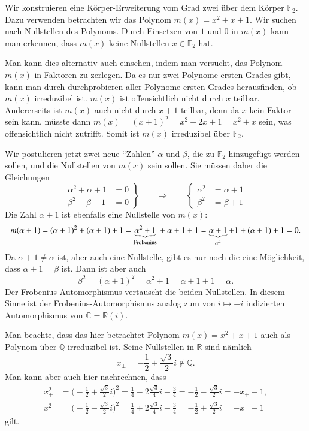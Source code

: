 \begin{beispiel}
Wir konstruieren eine Körper-Erweiterung vom Grad zwei über dem Körper
$\mathbb F_2$.
Dazu verwenden betrachten wir das Polynom $m(x)=x^2 + x + 1$.
Wir suchen nach Nullstellen des Polynoms.
Durch Einsetzen von $1$ und $0$ in $m(x)$ kann man erkennen, dass
$m(x)$ keine Nullstellen $x\in\mathbb F_2$ hat.

Man kann dies alternativ auch einsehen, indem man versucht, das Polynom
$m(x)$ in Faktoren zu zerlegen.
Da es nur zwei Polynome ersten Grades gibt, kann man durch durchprobieren
aller Polynome ersten Grades herausfinden, ob $m(x)$ irreduzibel ist.
$m(x)$ ist offensichtlich nicht durch $x$ teilbar.
Andererseits ist $m(x)$ auch nicht durch $x+1$ teilbar, denn da $x$ kein
Faktor sein kann, müsste dann $m(x)=(x+1)^2=x^2 +  2x + 1=x^2+x$ sein,
was offensichtlich nicht zutrifft.
Somit ist $m(x)$ irreduzibel über $\mathbb F_2$.

Wir postulieren jetzt zwei neue ``Zahlen'' $\alpha$ und $\beta$, die
zu $\mathbb F_2$ hinzugefügt werden sollen, und die Nullstellen von 
$m(x)$ sein sollen.
Sie müssen daher die Gleichungen
\[
\left.
\begin{aligned}
\alpha^2 + \alpha +1&=0
\\
\beta^2 + \beta +1&=0
\end{aligned}
\right\}
\qquad\Rightarrow\qquad
\left\{
\begin{aligned}
\alpha^2&=\alpha+1\\
\beta^2&=\beta+1
\end{aligned}
\right.
\]
Die Zahl $\alpha+1$ ist ebenfalls eine Nullstelle von $m(x)$:
\[
m(\alpha+1)
=
(\alpha+1)^2+(\alpha+1) + 1
=
\underbrace{\alpha^2 + 1}_{\text{Frobenius}}\mathstrut + \alpha + 1 + 1
=
\underbrace{\alpha+1}_{\alpha^2} + 1+ (\alpha + 1) + 1=0.
\]
Da $\alpha+1\ne \alpha$ ist, aber auch eine Nullstelle, gibt es nur
noch die eine Möglichkeit, dass $\alpha+1=\beta$ ist.
Dann ist aber auch
\[
\beta^2
=
(\alpha + 1)^2
= 
\alpha^2 + 1
=
\alpha + 1 + 1
=
\alpha.
\]
Der Frobenius-Automorphismus vertauscht die beiden Nullstellen.
In diesem Sinne ist der Frobenius-Automorphismus analog zum
von $i\mapsto -i$ indizierten Automorphismus von
$\mathbb C = \mathbb R(i)$.

Man beachte, dass das hier betrachtet Polynom $m(x)=x^2+x+1$ auch
als Polynom über $\mathbb Q$ irreduzibel ist.
Seine Nullstellen in $\mathbb R$ sind nämlich
\[
x_{\pm}=-\frac12 \pm\frac{\sqrt{3}}{2}i\not\in\mathbb Q.
\]
Man kann aber auch hier nachrechnen, dass 
\begin{align*}
x_+^2
&=
\biggl(-\frac12+\frac{\sqrt{3}}{2}i\biggr)^2
=
\frac14-2\frac{\sqrt{3}}{4}i-\frac34
=
-\frac12-\frac{\sqrt{3}}{2}i
=
-x_+-1,
\\
x_-^2
&=
\biggl(-\frac12-\frac{\sqrt{3}}{2}i\biggr)^2
=
\frac14+2\frac{\sqrt{3}}{4}i-\frac34
=
-\frac12+\frac{\sqrt{3}}{2}i
=
-x_--1
\end{align*}
gilt.


\end{beispiel}

